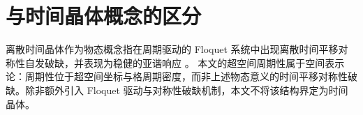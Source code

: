 \section{与时间晶体概念的区分}

离散时间晶体作为物态概念指在周期驱动的 Floquet 系统中出现离散时间平移对称性自发破缺，并表现为稳健的亚谐响应 \cite{NaturePhysicsTimeCrystal}。
本文的超空间周期性属于空间表示论：周期性位于超空间坐标与格周期密度，而非上述物态意义的时间平移对称性破缺。除非额外引入 Floquet 驱动与对称性破缺机制，本文不将该结构界定为时间晶体。

